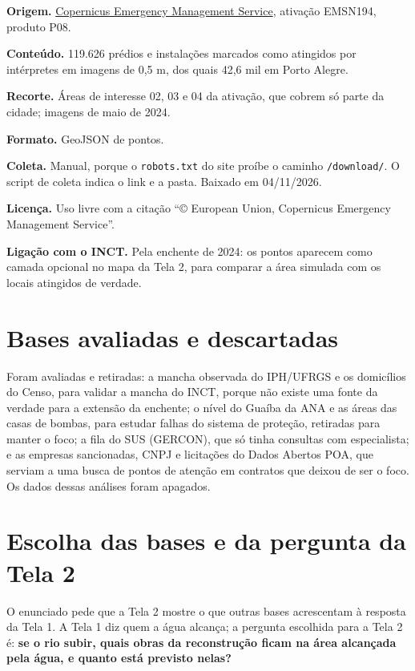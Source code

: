 \documentclass[11pt,a4paper]{article}
\newcommand{\campo}[1]{\texttt{#1}}
\begin{document}
\textbf{Origem.} \href{https://riskandrecovery.emergency.copernicus.eu/EMSN194/}{Copernicus Emergency Management Service}, ativação EMSN194, produto P08.

\textbf{Conteúdo.} 119.626 prédios e instalações marcados como atingidos por intérpretes em imagens de 0,5 m, dos quais 42,6 mil em Porto Alegre.

\textbf{Recorte.} Áreas de interesse 02, 03 e 04 da ativação, que cobrem só parte da cidade; imagens de maio de 2024.

\textbf{Formato.} GeoJSON de pontos.

\textbf{Coleta.} Manual, porque o \campo{robots.txt} do site proíbe o caminho \campo{/download/}. O script de coleta indica o link e a pasta. Baixado em 04/11/2026.

\textbf{Licença.} Uso livre com a citação ``© European Union, Copernicus Emergency Management Service''.

\textbf{Ligação com o INCT.} Pela enchente de 2024: os pontos aparecem como camada opcional no mapa da Tela 2, para comparar a área simulada com os locais atingidos de verdade.

\section{Bases avaliadas e descartadas}
\label{sec:descartadas}

Foram avaliadas e retiradas: a mancha observada do IPH/UFRGS e os domicílios do Censo, para validar a mancha do INCT, porque não existe uma fonte da verdade para a extensão da enchente; o nível do Guaíba da ANA e as áreas das casas de bombas, para estudar falhas do sistema de proteção, retiradas para manter o foco; a fila do SUS (GERCON), que só tinha consultas com especialista; e as empresas sancionadas, CNPJ e licitações do Dados Abertos POA, que serviam a uma busca de pontos de atenção em contratos que deixou de ser o foco. Os dados dessas análises foram apagados.

\section{Escolha das bases e da pergunta da Tela 2}

O enunciado pede que a Tela 2 mostre o que outras bases acrescentam à resposta da Tela 1. A Tela 1 diz quem a água alcança; a pergunta escolhida para a Tela 2 é: \textbf{se o rio subir, quais obras da reconstrução ficam na área alcançada pela água, e quanto está previsto nelas?}
\end{document}
